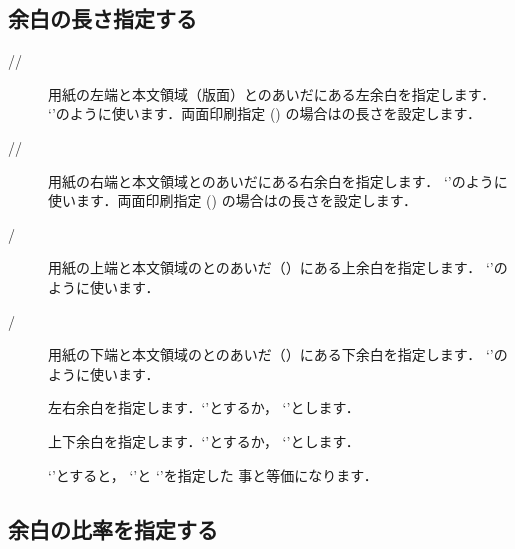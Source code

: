 \subsection{余白の長さ指定する}

\begin{description}
 \item[//]
 用紙の左端と本文領域（版面）とのあいだにある左余白を指定します．
 `'のように使います．両面印刷指定
 () の場合はの長さを設定します．
 \item[//]
 用紙の右端と本文領域とのあいだにある右余白を指定します．
 `'のように使います．両面印刷指定
 () の場合はの長さを設定します．
 \item[/]
  用紙の上端と本文領域のとのあいだ（）にある上余白を指定します．
 `'のように使います．
 \item[/]
  用紙の下端と本文領域のとのあいだ（）にある下余白を指定します．
 `'のように使います．
 \item[]
  左右余白を指定します．`'とするか，
  `'とします．
 \item[]
  上下余白を指定します．`'とするか，
  `'とします．
 \item[]
  `'とすると，
  `'と
  `'を指定した
  事と等価になります．
\end{description}

\subsection{余白の比率を指定する}

